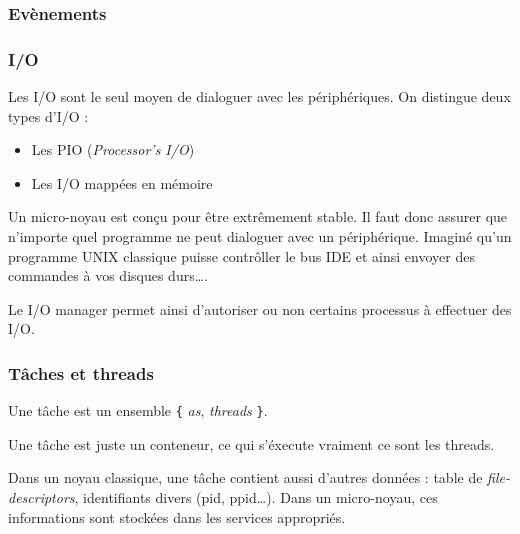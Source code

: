 
\begin{frame}
  \frametitle{Ev\`{e}nements}

  \begin{center}
  \end{center}

\end{frame}


\begin{frame}
  \frametitle{I/O}

  Les I/O sont le seul moyen de dialoguer avec les p\'{e}riph\'{e}riques. On
  distingue deux types d'I/O :

  \begin{itemize}
  \item
    Les PIO (\emph{Processor's I/O})
  \item
    Les I/O mapp\'{e}es en m\'{e}moire
  \end{itemize}

  \-

  Un micro-noyau est con\c{c}u pour \^{e}tre extr\^{e}mement stable. Il faut
  donc assurer que n'importe quel programme ne peut dialoguer avec un
  p\'{e}riph\'{e}rique. Imagin\'{e} qu'un programme UNIX classique puisse
  contr\^{o}ller le bus IDE et ainsi envoyer des commandes \`{a} vos disques
  durs\ldots.

  \-

  Le I/O manager permet ainsi d'autoriser ou non certains processus \`{a}
  effectuer des I/O.

\end{frame}


\begin{frame}[containsverbatim]
  \frametitle{T\^{a}ches et threads}

  Une t\^{a}che est un ensemble \verb|{| \emph{as}, \emph{threads}
  \verb|}|.

  \begin{center}
  \end{center}

  Une t\^{a}che est juste un conteneur, ce qui s'\'{e}xecute vraiment
  ce sont les threads.

  \-

  Dans un noyau classique, une t\^{a}che contient aussi d'autres
  donn\'{e}es : table de \emph{file-descriptors}, identifiants divers
  (pid, ppid\ldots). Dans un micro-noyau, ces informations sont
  stock\'{e}es dans les services appropri\'{e}s.

\end{frame}

